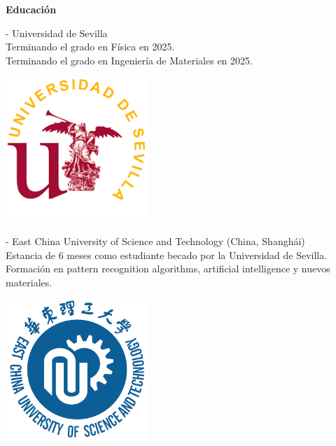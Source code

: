 \documentclass{report}
\begin{document}
\Large{
\textbf{Educación}\\

\begin{minipage}{0.7\textwidth} 
- Universidad de Sevilla\\
Terminando el grado en Física en 2025.\\
Terminando el grado en Ingeniería de Materiales en 2025.\\
\end{minipage}
\begin{minipage}{0.3\textwidth} 
\raggedleft
\includegraphics[width=0.4\textwidth]{us.png}
\end{minipage}
\vspace{.3cm}

\begin{minipage}{0.7\textwidth} 
- East China University of Science and Technology (China, Shanghái)\\
Estancia de 6 meses como estudiante becado por la Universidad de Sevilla. Formación en pattern recognition algorithms, artificial intelligence y nuevos materiales.\\
\end{minipage}
\begin{minipage}{0.3\textwidth}
\raggedleft 
\includegraphics[width=0.4\textwidth]{ecust.png}
\end{minipage}

}
\end{document}
